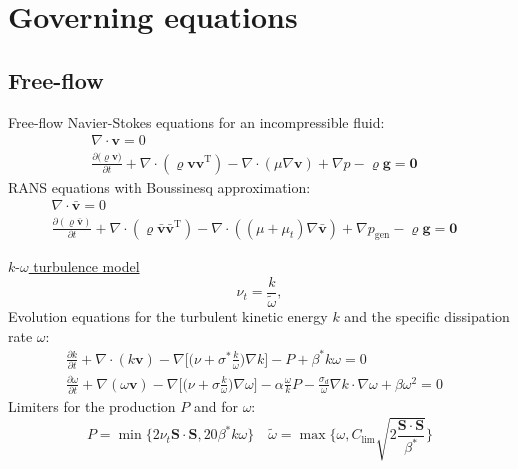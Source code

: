 \documentclass{beamer}
\begin{document}
\section{Governing equations}
\subsection*{Free-flow}
\begin{frame}{Free-flow}
Navier-Stokes equations for an incompressible fluid:
\begin{align*}
\nabla \cdot \mathbf{v} = 0&\\
\frac{\partial{(\varrho \mathbf{v}})}{\partial t} + \nabla 
\cdot (\varrho \mathbf{v} \mathbf{v}^\mathrm{T}) - \nabla \cdot (\mu \nabla 
\mathbf{v}) + \nabla p  - \varrho\mathbf{g} = \mathbf{0}&
\end{align*}
RANS equations with Boussinesq approximation:
\begin{align*}
\nabla \cdot \bar{\mathbf{v}} = 0&\\
\frac{\partial{(\varrho \bar{\mathbf{v}})}}{\partial t} + \nabla 
\cdot (\varrho \bar{\mathbf{v}} \bar{\mathbf{v}}^\mathrm{T}) - \nabla \cdot 
((\mu + \mu_t) \nabla \bar{\mathbf{v}}) + \nabla p_\text{gen} 
-\varrho\mathbf{g}= \mathbf{0}&
\end{align*}
\end{frame}
\begin{frame}[label=ko]{\hyperlink{koSupp}{$k\text{-}\omega$ turbulence model}}
\begin{equation*}
\nu_t = \frac{k}{\tilde{\omega}}, 
\end{equation*}
Evolution equations for the turbulent kinetic energy $k$ and the specific 
dissipation 
rate $\omega$:
\begin{align*}
\frac{\partial k}{\partial t} + \nabla \cdot (k\mathbf{v}) - \nabla 
\bigg[\bigg(\nu + \sigma^*\frac{k}{\omega}\bigg) \nabla k\bigg] -P + \beta^* k 
\omega = 0&\\
\frac{\partial \omega}{\partial t} + \nabla (\omega \mathbf{v}) - 
\nabla \bigg[ \bigg( \nu + \sigma \frac{k}{\omega} \bigg) \nabla \omega 
\bigg] - \alpha \frac{\omega}{k} P -\frac{\sigma_d}{\omega} \nabla k \cdot 
\nabla \omega+ \beta \omega^2 = 0&
\end{align*}
Limiters for the production $P$ and for $\omega$:
\begin{equation*}
P = \min \{ 2 \nu_t \mathbf{S} \cdot \mathbf{S}, 20 \beta^* k \omega \} \quad 
\tilde{\omega} = \max \Bigg\{ \omega, C_\text{lim} \sqrt{ 
2\frac{\mathbf{S}\cdot\mathbf{S}}{\beta^*}} \Bigg\}
\end{equation*}
\end{frame}
\end{document}
